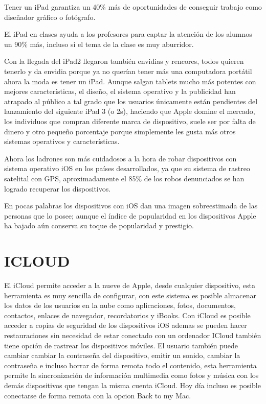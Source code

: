 Tener un iPad garantiza un 40\% más de oportunidades de
conseguir trabajo como diseñador gráfico o fotógrafo.

El iPad en clases ayuda a los profesores para captar la atención
de los alumnos un 90\% más, incluso si el tema de la clase es
muy aburridor.

Con la llegada del iPad2 llegaron también envidias y rencores,
todos quieren tenerlo y da envidia porque ya no querían tener
más una computadora portátil ahora la moda es tener un iPad.
Aunque salgan tablets mucho más potentes con mejores
características, el diseño, el sistema operativo y la publicidad
han atrapado al público a tal grado que los usuarios únicamente
están pendientes del lanzamiento del siguiente iPad 3 (o 2s),
haciendo que Apple domine el mercado, los individuos que
compran diferente marca de dispositivo, suele ser por falta de
dinero y otro pequeño porcentaje porque simplemente les gusta
más otros sistemas operativos y características.

Ahora los ladrones son más cuidadosos a la hora de robar
dispositivos con sistema operativo iOS en los países
desarrollados, ya que su sistema de rastreo satelital con GPS,
aproximadamente el 85\% de los robos denunciados se han
logrado recuperar los dispositivos.

En pocas palabras los dispositivos con iOS dan una imagen
sobreestimada de las personas que lo posee; aunque el índice de
popularidad en los dispositivos Apple ha bajado aún conserva su
toque de popularidad y prestigio.


\section*{ICLOUD}

El iCloud permite acceder a la nueve de Apple, desde
cualquier dispositivo, esta herramienta es muy sencilla de
configurar, con este sistema es posible almacenar los datos
de los usuarios en la nube como aplicaciones, fotos,
documentos, contactos, enlaces de navegador,
recordatorios y iBooks. 
Con iCloud es posible acceder a
copias de seguridad de los dispositivos iOS ademas se
pueden hacer restauraciones sin necesidad de estar
conectado con un ordenador
ICloud también tiene opción de rastrear los dispositivos
móviles. El usuario también puede cambiar cambiar la
contraseña del dispositivo, emitir un sonido, cambiar la
contraseña e incluso borrar de forma remota todo el
contenido, esta herramienta permite la sincronización de información
multimedia como fotos y música con los demás dispositivos
que tengan la misma cuenta iCloud. 
Hoy día incluso es
posible conectarse de forma remota con la opcion Back to
my Mac.
